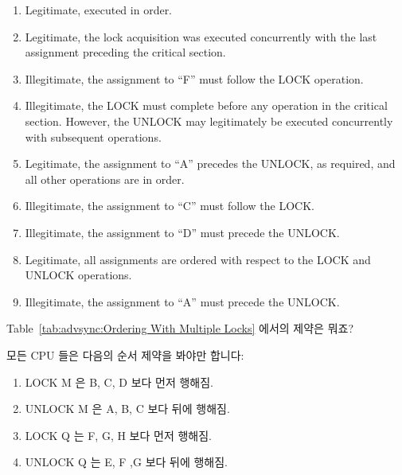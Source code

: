 \begin{enumerate}
	\begin{enumerate}
	\item	Legitimate, executed in order.
	\item	Legitimate, the lock acquisition was executed concurrently
		with the last assignment preceding the critical section.
	\item	Illegitimate, the assignment to ``F'' must follow the LOCK
		operation.
	\item	Illegitimate, the LOCK must complete before any operation in
		the critical section.  However, the UNLOCK may legitimately
		be executed concurrently with subsequent operations.
	\item	Legitimate, the assignment to ``A'' precedes the UNLOCK,
		as required, and all other operations are in order.
	\item	Illegitimate, the assignment to ``C'' must follow the LOCK.
	\item	Illegitimate, the assignment to ``D'' must precede the UNLOCK.
	\item	Legitimate, all assignments are ordered with respect to the
		LOCK and UNLOCK operations.
	\item	Illegitimate, the assignment to ``A'' must precede the UNLOCK.
	\end{enumerate}
	\fi

\QuickQ{}
	Table~\ref{tab:advsync:Ordering With Multiple Locks} 에서의 제약은
	뭐죠?

\QuickA{}
	모든 CPU 들은 다음의 순서 제약을 봐야만 합니다:
	\begin{enumerate}
	\item	LOCK M 은 B, C, D 보다 먼저 행해짐.
	\item	UNLOCK M 은 A, B, C 보다 뒤에 행해짐.
	\item	LOCK Q 는 F, G, H 보다 먼저 행해짐.
	\item	UNLOCK Q 는 E, F ,G 보다 뒤에 행해짐.
	\end{enumerate}

\end{enumerate}
